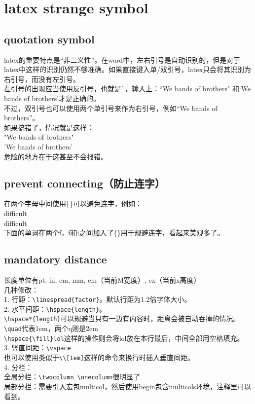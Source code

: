 \documentclass{article}
\begin{document}
\section{latex strange symbol}
\subsection{quotation symbol}
\noindent
latex的重要特点是“非二义性”。在word中，左右引号是自动识别的，但是对于latex中这样的识别仍然不够准确。如果直接键入单/双引号，latex只会将其识别为右引号，而没有左引号。\\
左引号的出现应当使用反引号，也就是\verb|`|，输入上：``We bands of brothers" 和`We bands of brothers'才是正确的。\\
不过，双引号也可以使用两个单引号来作为右引号，例如``We bands of brothers''。\\
如果搞错了，情况就是这样：\\
"We bands of brothers"\\
'We bands of brothers'\\
危险的地方在于这甚至不会报错。
\subsection{prevent connecting（防止连字）}
\noindent
在两个字母中间使用\{\}可以避免连字，例如：\\
difficult\\
dif{}f{}icult\\
下面的单词在两个f，f和i之间加入了\{\}用于规避连字，看起来美观多了。
\subsection{mandatory distance}
\noindent
长度单位有pt, in, cm, mm, em（当前M宽度）, ex（当前x高度）\\
几种修改：\\
1. 行距：\verb|\linespread{factor}|。默认行距为1.2倍字体大小。\\
2. 水平间距：\verb|\hspace{length}|。\\
\hspace*{2em}\verb|\hspace*{length}|可以规避当只有一边有内容时，距离会被自动吞掉的情况。\\
\hspace*{2em}\verb|\quad|代表1em，两个q则是2em\\
\hspace*{2em}\verb|\hspace{\fill}lol|这样的操作则会将lol放在本行最后，中间全部用空格填充。\\
3. 竖直间距：\verb|\vspace|\\
\hspace*{2em}也可以使用类似于\verb|\\[1em]|这样的命令来换行时插入垂直间距。\\
4. 分栏：\\
全局分栏：\verb|\twocolumn \onecolumn|很明显了\\
局部分栏：需要引入宏包multicol，然后使用begin包含multicols环境，注释里可以看到。
\end{document}

